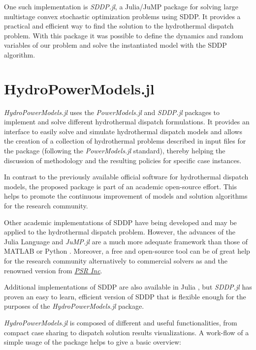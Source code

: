 \documentclass{juliacon}
\begin{document}
One such implementation is \textit{SDDP.jl}, a Julia/JuMP package for solving large multistage convex stochastic optimization problems using SDDP. It provides a practical and efficient way to find the solution to the hydrothermal dispatch problem. With this package it was possible to define the dynamics and random variables of our problem and solve the instantiated model with the SDDP algorithm.

\section{HydroPowerModels.jl}
\label{sec:hydropowermodels}

\textit{HydroPowerModels.jl} uses the \textit{PowerModels.jl} and \textit{SDDP.jl} packages to implement and solve different hydrothermal dispatch formulations. It provides an interface to easily solve and simulate hydrothermal dispatch models and allows the creation of a collection of hydrothermal problems described in input files for the package (following the \textit{PowerModels.jl} standard), thereby helping the discussion of methodology and the resulting policies for specific case instances. 

In contrast to the previously available official software for hydrothermal dispatch models, the proposed package is part of an academic open-source effort. This helps to promote the continuous improvement of models and solution algorithms for the research community.

Other academic implementations of SDDP have being developed and may be applied to the hydrothermal dispatch problem. However, the advances of the Julia Language and \textit{JuMP.jl} are a much more adequate framework than those of MATLAB \cite{FATS} or Python \cite{raso2016optimist,Lingquan2019}.  Moreover, a free and open-source tool can be of great help for the research community alternatively to commercial solvers as \cite{lohndorf2018quasar} and the renowned version from \href{https://www.psr-inc.com/softwares-en/}{\textit{PSR Inc}}.

Additional implementations of SDDP are also available in Julia \cite{leclerestochdynamicprogramming} \cite{StructDualDynProg}, but \textit{SDDP.jl} \cite{dowson_sddp.jl} has proven an easy to learn, efficient version of SDDP that is flexible enough for the purposes of the \textit{HydroPowerModels.jl} package.

\textit{HydroPowerModels.jl} is composed of different and useful functionalities, from compact case sharing to dispatch solution results visualizations. A work-flow of a simple usage of the package helps to give a basic overview:
\end{document}

